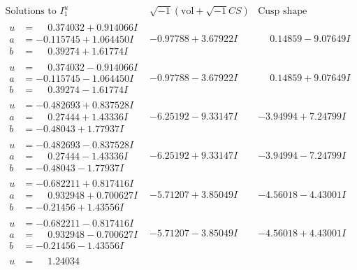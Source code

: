 \documentclass[1p]{elsarticle_modified}
\theoremstyle{definition}
\newcommand{\I}{\sqrt{-1}}
\begin{document}
$$\begin{array}{c|c|c}  
\text{Solutions to }I^u_{1}& \I (\text{vol} + \sqrt{-1}CS) & \text{Cusp shape}\\
 \hline 
\begin{aligned}
u &= \phantom{-}0.374032 + 0.914066 I \\
a &= -0.115745 + 1.064450 I \\
b &= \phantom{-}0.39274 + 1.61774 I\end{aligned}
 & -0.97788 + 3.67922 I & \phantom{-}0.14859 - 9.07649 I \\ \hline\begin{aligned}
u &= \phantom{-}0.374032 - 0.914066 I \\
a &= -0.115745 - 1.064450 I \\
b &= \phantom{-}0.39274 - 1.61774 I\end{aligned}
 & -0.97788 - 3.67922 I & \phantom{-}0.14859 + 9.07649 I \\ \hline\begin{aligned}
u &= -0.482693 + 0.837528 I \\
a &= \phantom{-}0.27444 + 1.43336 I \\
b &= -0.48043 + 1.77937 I\end{aligned}
 & -6.25192 - 9.33147 I & -3.94994 + 7.24799 I \\ \hline\begin{aligned}
u &= -0.482693 - 0.837528 I \\
a &= \phantom{-}0.27444 - 1.43336 I \\
b &= -0.48043 - 1.77937 I\end{aligned}
 & -6.25192 + 9.33147 I & -3.94994 - 7.24799 I \\ \hline\begin{aligned}
u &= -0.682211 + 0.817416 I \\
a &= \phantom{-}0.932948 + 0.700627 I \\
b &= -0.21456 + 1.43556 I\end{aligned}
 & -5.71207 + 3.85049 I & -4.56018 - 4.43001 I \\ \hline\begin{aligned}
u &= -0.682211 - 0.817416 I \\
a &= \phantom{-}0.932948 - 0.700627 I \\
b &= -0.21456 - 1.43556 I\end{aligned}
 & -5.71207 - 3.85049 I & -4.56018 + 4.43001 I \\ \hline\begin{aligned}
u &= \phantom{-}1.24034\phantom{ +0.000000I} \\

\end{aligned}
\end{array}$$
\end{document}
